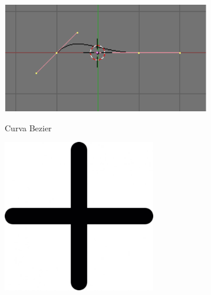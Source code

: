 \documentclass[notes,slidesec,a4]{seminar}
\begin{document}
\begin{hslide}
	\begin{minipage}{0.45\textwidth}
		\includegraphics[width=\textwidth]{InterfazBlender05.png}
		\begin{center}
			Curva Bezier
		\end{center}
	\end{minipage}
	\begin{minipage}{0.1\textwidth}
		\begin{center}
			\includegraphics[width=0.5\textwidth]{mas.jpg}
		\end{center}
	\end{minipage}
	\begin{minipage}{0.5\textwidth}

\end{minipage}
\end{hslide}
\end{document}
